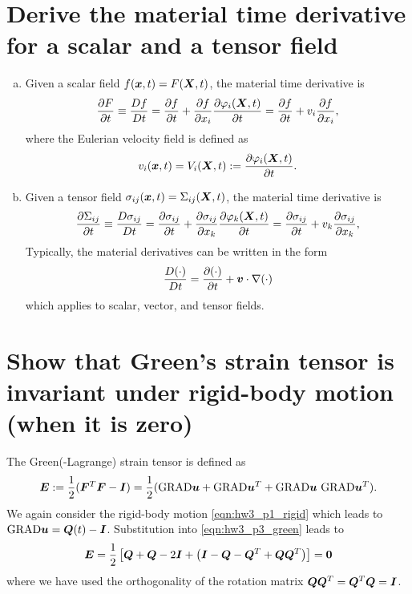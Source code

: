 \section{Derive the material time derivative for a scalar and a tensor field}
\begin{enumerate}[(a)]
\item {
    Given a scalar field $f(\bm{x}, t) = F(\bm{X}, t)$, the material time derivative is 
    \begin{equation}
        \frac{\partial F}{\partial t} \equiv \frac{Df}{Dt} = \frac{\partial f}{\partial t} + \frac{\partial f}{\partial x_i}\frac{\partial \varphi_i(\bm{X}, t)}{\partial t} = \frac{\partial f}{\partial t} + v_i \frac{\partial f}{\partial x_i},
    \end{equation}
    where the Eulerian velocity field is defined as 
    \begin{equation}
        v_i(\bm{x}, t) = V_i(\bm{X}, t) :=  \frac{\partial \varphi_i(\bm{X}, t)}{\partial t}.
    \end{equation}
}
\item {
    Given a tensor field $\sigma_{ij}(\bm{x}, t) = \Sigma_{ij}(\bm{X}, t)$, the material time derivative is 
    \begin{equation}
        \frac{\partial \Sigma_{ij}}{\partial t} \equiv \frac{D\sigma_{ij}}{Dt} = \frac{\partial \sigma_{ij}}{\partial t} + \frac{\partial \sigma_{ij}}{\partial x_k}\frac{\partial \varphi_k(\bm{X}, t)}{\partial t} = \frac{\partial \sigma_{ij}}{\partial t} + v_k \frac{\partial \sigma_{ij}}{\partial x_k},
    \end{equation}
    Typically, the material derivatives can be written in the form 
    \begin{equation}
        \frac{D(\cdot)}{Dt} = \frac{\partial (\cdot)}{\partial t} + \bm{v} \cdot \nabla(\cdot)
    \end{equation}
    which applies to scalar, vector, and tensor fields. 
}
\end{enumerate}

\section{Show that Green's strain tensor is invariant under rigid-body motion (when it is zero)}
The Green(-Lagrange) strain tensor is defined as 
\begin{equation}\label{eqn:hw3_p3_green}
    \bm{E}:= \frac{1}{2}(\bm{F}^T \bm{F} - \bm{I}) = \frac{1}{2}(\textrm{GRAD}\bm{u} + \textrm{GRAD}\bm{u}^T + \textrm{GRAD}\bm{u}~\textrm{GRAD}\bm{u}^T).
\end{equation}
We again consider the rigid-body motion \cref{eqn:hw3_p1_rigid} which leads to $\textrm{GRAD}\bm{u} = \bm{Q}(t) - \bm{I}$. 
Substitution into \cref{eqn:hw3_p3_green} leads to 
\begin{equation}
    \bm{E} = \frac{1}{2}\left[\bm{Q} + \bm{Q} - 2\bm{I} + \left(\bm{I} - \bm{Q} - \bm{Q}^T + \bm{Q}\bm{Q}^T\right)\right] = \bm{0}
\end{equation}
where we have used the orthogonality of the rotation matrix $\bm{Q}\bm{Q}^T = \bm{Q}^T \bm{Q} = \bm{I}$.

